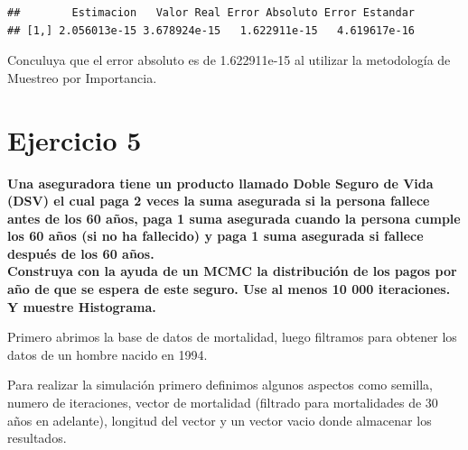 \documentclass[
]{article}
\newenvironment{Shaded}{\begin{snugshade}}{\end{snugshade}}
\newcommand{\CommentTok}[1]{\textcolor[rgb]{0.56,0.35,0.01}{\textit{#1}}}
\newcommand{\DecValTok}[1]{\textcolor[rgb]{0.00,0.00,0.81}{#1}}
\newcommand{\FunctionTok}[1]{\textcolor[rgb]{0.13,0.29,0.53}{\textbf{#1}}}
\newcommand{\NormalTok}[1]{#1}
\newcommand{\OtherTok}[1]{\textcolor[rgb]{0.56,0.35,0.01}{#1}}
\newcommand{\SpecialCharTok}[1]{\textcolor[rgb]{0.81,0.36,0.00}{\textbf{#1}}}
\newcommand{\StringTok}[1]{\textcolor[rgb]{0.31,0.60,0.02}{#1}}
\begin{document}
\begin{verbatim}
##        Estimacion   Valor Real Error Absoluto Error Estandar
## [1,] 2.056013e-15 3.678924e-15   1.622911e-15   4.619617e-16
\end{verbatim}

Conculuya que el error absoluto es de 1.622911e-15 al utilizar la
metodología de Muestreo por Importancia.

\newpage

\hypertarget{ejercicio-5}{%
\section{Ejercicio 5}\label{ejercicio-5}}

\textbf{Una aseguradora tiene un producto llamado Doble Seguro de Vida
(DSV) el cual paga 2 veces la suma asegurada si la persona fallece antes
de los 60 años, paga 1 suma asegurada cuando la persona cumple los 60
años (si no ha fallecido) y paga 1 suma asegurada si fallece después de
los 60 años.}\\
\textbf{Construya con la ayuda de un MCMC la distribución de los pagos
por año de que se espera de este seguro. Use al menos 10 000
iteraciones. Y muestre Histograma.}

Primero abrimos la base de datos de mortalidad, luego filtramos para
obtener los datos de un hombre nacido en 1994.

\begin{Shaded}
\end{Shaded}

Para realizar la simulación primero definimos algunos aspectos como
semilla, numero de iteraciones, vector de mortalidad (filtrado para
mortalidades de 30 años en adelante), longitud del vector y un vector
vacio donde almacenar los resultados.
\end{document}
